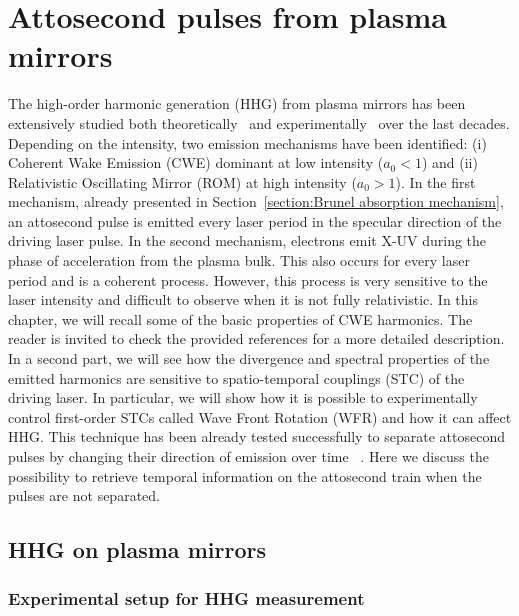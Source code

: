 \chapter{Attosecond pulses from plasma mirrors}\label{chapter:Properties of attosecond pulses emitted using plasma mirrors}
\minitoc
\thispagestyle{empty}

The high-order harmonic generation (HHG) from plasma mirrors has been extensively studied both theoretically~\cite{thaury2010high,lichters,Naumova2004,gonoskov2011ultrarelativistic,TheseCedric,TheseArnaud}  and experimentally~\cite{burnett1977harmonic,VonderLinde1995,roos1999controlling,Carman1981,borot2011high,thaury2010high,TheseCanova}  over the last decades.
 Depending on the intensity, two emission mechanisms have been identified: (i) Coherent Wake Emission (CWE) dominant at low intensity ($a_0 < 1$) and (ii) Relativistic Oscillating Mirror (ROM) at high intensity ($a_0 > 1$). 
In the  first mechanism, already presented in Section~\ref{section:Brunel absorption mechanism}, an attosecond pulse is emitted every laser period in the specular direction of the driving laser pulse. In the second mechanism, electrons emit X-UV during the phase of acceleration from the plasma bulk. This also occurs for every laser period and is a coherent process. However, this process is very sensitive to the laser intensity and difficult to observe when it is not fully relativistic.
In this chapter, we will recall some of the basic properties of CWE harmonics. The reader is invited to check the provided references for a more detailed description. In a second part, we will see how the divergence and spectral properties of the emitted harmonics are sensitive to spatio-temporal couplings (STC) of the driving laser. In particular, we will show how it is possible to experimentally control first-order STCs called Wave Front Rotation (WFR) and how it can affect HHG. This technique has been already tested successfully to separate attosecond pulses by changing their direction of emission over time ~\cite{Wheeler2012}. Here we discuss the possibility to retrieve temporal information on the attosecond train when the pulses are not separated.  

\section{HHG on plasma mirrors}

\subsection{Experimental setup for HHG measurement}\label{subsub:Experimental set-up for HHG measurement}

